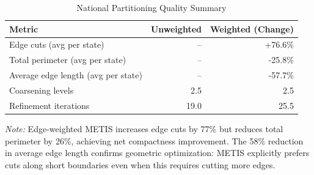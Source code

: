 \begin{table}[t]
\caption{National Partitioning Quality Summary}
\label{tab:partition-summary}
\centering
\begin{tabular}{@{}lrr@{}}
\toprule
\textbf{Metric} & \textbf{Unweighted} & \textbf{Weighted (Change)} \\
\midrule
Edge cuts (avg per state) & -- & +76.6\% \\
Total perimeter (avg per state) & -- & -25.8\% \\
Average edge length (avg per state) & -- & -57.7\% \\
\midrule
Coarsening levels & 2.5 & 2.5 \\
Refinement iterations & 19.0 & 25.5 \\
\bottomrule
\end{tabular}
\vspace{0.5em}

\footnotesize
\textit{Note:} Edge-weighted METIS increases edge cuts by 77\% but reduces
total perimeter by 26\%, achieving net compactness improvement.
The 58\% reduction in average edge length confirms geometric optimization:
METIS explicitly prefers cuts along short boundaries even when this requires cutting more edges.
\end{table}
